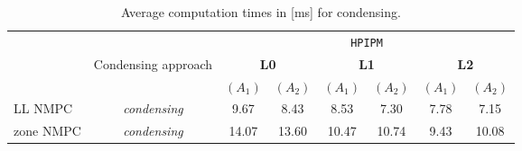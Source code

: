 \begin{table}[h]
\caption{Average computation times in [ms] for condensing.}
\begin{tabular}{lccccccc}
\toprule
\multirow{2}[3]{*}{} & & \multicolumn{2}{c}{} & \multicolumn{2}{c}{\texttt{HPIPM}}\\
\cmidrule(lr){3-8}
 & \multirow{2}[3]{*}{Condensing approach} & \multicolumn{2}{c}{\textbf{L0}} & \multicolumn{2}{c}{\textbf{L1}} & \multicolumn{2}{c}{\textbf{L2}}\\
\cmidrule(lr){3-4} \cmidrule(lr){5-6} \cmidrule(lr){7-8}
 & & $(A_1)$ & $(A_2)$ & $(A_1)$ & $(A_2)$ & $(A_1)$ & $(A_2)$\\
\midrule
LL NMPC & \textit{condensing} & 9.67 & 8.43 & 8.53 & 7.30 & 7.78 & 7.15 \\
\midrule
zone NMPC & \textit{condensing} & 14.07 & 13.60 & 10.47 & 10.74 & 9.43 & 10.08 \\
\bottomrule
\end{tabular}\label{tab:cputime_c}
\end{table}

